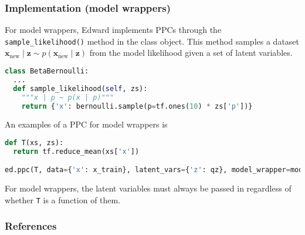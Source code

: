 \subsubsection{Implementation (model wrappers)}

For model wrappers, Edward implements PPCs through the
\texttt{sample_likelihood()} method in the class object. This method
samples a dataset
$\mathbf{x}_{\text{new}}\mid \mathbf{z}\sim
p(\mathbf{x}_{\text{new}}\mid \mathbf{z})$ from the
model likelihood given a set of latent variables.
\begin{lstlisting}[language=Python]
class BetaBernoulli:
  ...
  def sample_likelihood(self, zs):
    """x | p ~ p(x | p)"""
    return {'x': bernoulli.sample(p=tf.ones(10) * zs['p'])}
\end{lstlisting}

An examples of a PPC for model wrappers is
\begin{lstlisting}[language=Python]
def T(xs, zs):
  return tf.reduce_mean(xs['x'])

ed.ppc(T, data={'x': x_train}, latent_vars={'z': qz}, model_wrapper=model)
\end{lstlisting}
For model wrappers, the latent variables must always be
passed in regardless of whether \texttt{T} is a function of them.

\subsubsection{References}\label{references}

